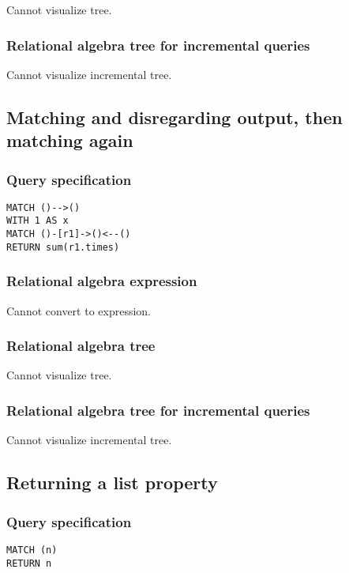 Cannot visualize tree.

\subsubsection*{Relational algebra tree for incremental queries}

Cannot visualize incremental tree.

\subsection{Matching and disregarding output, then matching again}

\subsubsection*{Query specification}

\begin{lstlisting}
MATCH ()-->()
WITH 1 AS x
MATCH ()-[r1]->()<--()
RETURN sum(r1.times)
\end{lstlisting}

\subsubsection*{Relational algebra expression}

Cannot convert to expression.

\subsubsection*{Relational algebra tree}

Cannot visualize tree.

\subsubsection*{Relational algebra tree for incremental queries}

Cannot visualize incremental tree.

\subsection{Returning a list property}

\subsubsection*{Query specification}

\begin{lstlisting}
MATCH (n)
RETURN n
\end{lstlisting}

